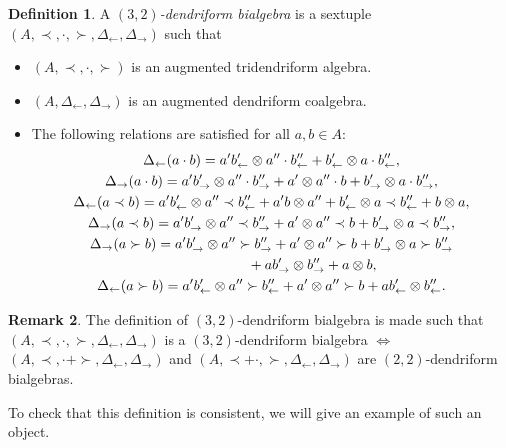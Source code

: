 \documentclass[pdftex]{sigma}
\numberwithin{equation}{section}
\theoremstyle{definition}
\newtheorem{defi}{Definition}[section]
\newtheorem{Rq}[defi]{Remark}
\theoremstyle{plain}
\begin{document}
 \begin{defi}\label{deftroisdeux}
 	A \emph{$(3,2)$-dendriform bialgebra} is a sextuple $(A,\prec,\cdot,\succ,\Delta_{\leftarrow},\Delta_{\rightarrow})$ such that
 	\begin{itemize}\itemsep=0pt
 		\item $(A,\prec,\cdot,\succ)$ is an augmented tridendriform algebra.
 		\item $(A,\Delta_{\leftarrow},\Delta_{\rightarrow})$ is an augmented dendriform coalgebra.
 		\item The following relations are satisfied for all $a,b\in A$:
 		\begin{gather}
 			\Delta_{\leftarrow}(a\cdot b) =a'b'_{\leftarrow}\otimes a''\cdot b''_{\leftarrow}+b'_{\leftarrow}\otimes a\cdot b''_{\leftarrow}, \label{troisdeuxrel1}\\
 			\Delta_{\rightarrow}(a\cdot b) =a'b'_{\rightarrow}\otimes a''\cdot b''_{\rightarrow}+a'\otimes a''\cdot b+b'_{\rightarrow}\otimes a\cdot b''_{\rightarrow}, \label{troisdeuxrel2}\\
 			\Delta_{\leftarrow}(a\prec b) =a'b'_{\leftarrow}\otimes a''\prec b''_{\leftarrow}+a'b\otimes a'' +b'_{\leftarrow}\otimes a\prec b''_{\leftarrow}+b\otimes a, \label{troisdeuxrel3}\\
 			\Delta_{\rightarrow}(a\prec b) =a'b'_{\rightarrow}\otimes a''\prec b''_{\rightarrow}+a'\otimes a''\prec b +b'_{\rightarrow}\otimes a\prec b''_{\rightarrow},
 			\label{troisdeuxrel4}\\
 			\Delta_{\rightarrow}(a\succ b) =a'b'_{\rightarrow}\otimes a''\succ b''_{\rightarrow}+a'\otimes a''\succ b +b'_{\rightarrow}\otimes a\succ b''_{\rightarrow} \nonumber\\ \hphantom{\Delta_{\rightarrow}(a\succ b) =}{}+ab'_{\rightarrow}\otimes b''_{\rightarrow}+a\otimes b,
 	\label{troisdeuxrel5}		\\
 			\Delta_{\leftarrow}(a\succ b) =a'b'_{\leftarrow}\otimes a''\succ b''_{\leftarrow}+a'\otimes a''\succ b +ab'_{\leftarrow}\otimes b''_{\leftarrow}.
 			\label{troisdeuxrel6}
 		\end{gather}
 	\end{itemize}
 \end{defi}
\begin{Rq}
	The definition of $(3,2)$-dendriform bialgebra is made such that
$
	 (A,\prec,\cdot,\succ,\Delta_{\leftarrow},\allowbreak \Delta_{\rightarrow})$ is a $(3,2)$-dendriform bialgebra
		 $\iff$
		 $(A,\prec,\cdot+\succ,\Delta_{\leftarrow},\Delta_{\rightarrow})$ and $(A,\prec+\cdot,\succ,\Delta_{\leftarrow},\Delta_{\rightarrow})$
	 are $(2,2)$-dendriform bialgebras.
\end{Rq}
To check that this definition is consistent, we will give an example of such an object.
\end{document}
